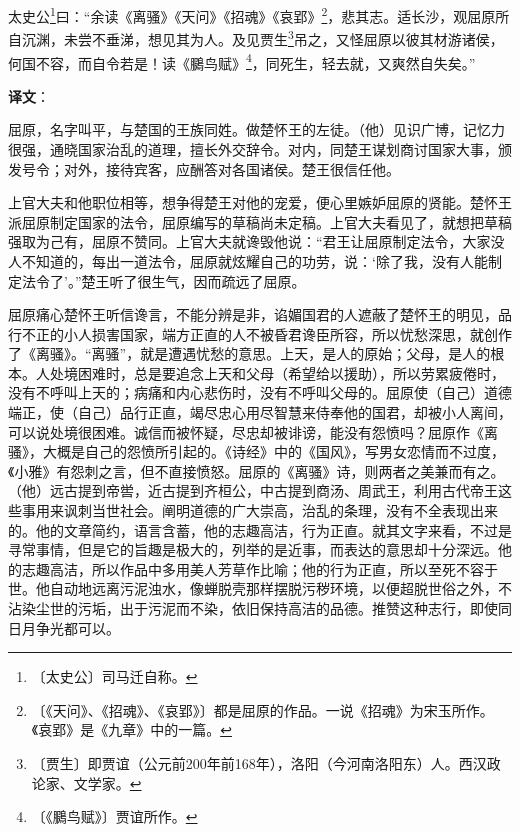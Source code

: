 \documentclass[12pt,UTF-8,openany]{ctexbook}
\begin{document}
\begin{normalsize}
    太史公\footnote{〔太史公〕司马迁自称。}曰：“余读《离骚》《天问》《招魂》《哀郢》\footnote{〔《天问》、《招魂》、《哀郢》〕都是屈原的作品。一说《招魂》为宋玉所作。《哀郢》是《九章》中的一篇。}，悲其志。适长沙，观屈原所自沉渊，未尝不垂涕，想见其为人。及见贾生\footnote{〔贾生〕即贾谊（公元前200年前168年），洛阳（今河南洛阳东）人。西汉政论家、文学家。}吊之，又怪屈原以彼其材游诸侯，何国不容，而自令若是！读《鵩鸟赋》\footnote{〔《鵩鸟赋》〕贾谊所作。}，同死生，轻去就，又爽然自失矣。”
\end{normalsize}


\newpage

\textbf{译文}：

\vspace{1em}

\begin{normalsize}
    
    屈原，名字叫平，与楚国的王族同姓。做楚怀王的左徒。（他）见识广博，记忆力很强，通晓国家治乱的道理，擅长外交辞令。对内，同楚王谋划商讨国家大事，颁发号令；对外，接待宾客，应酬答对各国诸侯。楚王很信任他。
    
    上官大夫和他职位相等，想争得楚王对他的宠爱，便心里嫉妒屈原的贤能。楚怀王派屈原制定国家的法令，屈原编写的草稿尚未定稿。上官大夫看见了，就想把草稿强取为己有，屈原不赞同。上官大夫就谗毁他说：“君王让屈原制定法令，大家没人不知道的，每出一道法令，屈原就炫耀自己的功劳，说：‘除了我，没有人能制定法令了’。”楚王听了很生气，因而疏远了屈原。
    
    屈原痛心楚怀王听信谗言，不能分辨是非，谄媚国君的人遮蔽了楚怀王的明见，品行不正的小人损害国家，端方正直的人不被昏君谗臣所容，所以忧愁深思，就创作了《离骚》。“离骚”，就是遭遇忧愁的意思。上天，是人的原始；父母，是人的根本。人处境困难时，总是要追念上天和父母（希望给以援助），所以劳累疲倦时，没有不呼叫上天的；病痛和内心悲伤时，没有不呼叫父母的。屈原使（自己）道德端正，使（自己）品行正直，竭尽忠心用尽智慧来侍奉他的国君，却被小人离间，可以说处境很困难。诚信而被怀疑，尽忠却被诽谤，能没有怨愤吗？屈原作《离骚》，大概是自己的怨愤所引起的。《诗经》中的《国风》，写男女恋情而不过度，《小雅》有怨刺之言，但不直接愤怒。屈原的《离骚》诗，则两者之美兼而有之。（他）远古提到帝喾，近古提到齐桓公，中古提到商汤、周武王，利用古代帝王这些事用来讽刺当世社会。阐明道德的广大崇高，治乱的条理，没有不全表现出来的。他的文章简约，语言含蓄，他的志趣高洁，行为正直。就其文字来看，不过是寻常事情，但是它的旨趣是极大的，列举的是近事，而表达的意思却十分深远。他的志趣高洁，所以作品中多用美人芳草作比喻；他的行为正直，所以至死不容于世。他自动地远离污泥浊水，像蝉脱壳那样摆脱污秽环境，以便超脱世俗之外，不沾染尘世的污垢，出于污泥而不染，依旧保持高洁的品德。推赞这种志行，即使同日月争光都可以。
    

\end{normalsize}
\end{document}
